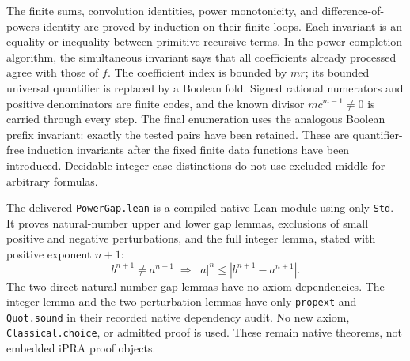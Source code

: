 The finite sums, convolution identities, power monotonicity, and
difference-of-powers identity are proved by induction on their finite
loops.  Each invariant is an equality or inequality between primitive
recursive terms.  In the power-completion algorithm, the simultaneous
invariant says that all coefficients already processed agree with those
of $f$.  The coefficient index is bounded by $mr$; its bounded universal
quantifier is replaced by a Boolean fold.  Signed rational numerators
and positive denominators are finite codes, and the known divisor
$mc^{m-1}\ne0$ is carried through every step.  The final enumeration
uses the analogous Boolean prefix invariant: exactly the tested pairs
have been retained.  These are quantifier-free induction invariants
after the fixed finite data functions have been introduced.  Decidable
integer case distinctions do not use excluded middle for arbitrary
formulas.

The delivered \texttt{PowerGap.lean} is a compiled native Lean module
using only \texttt{Std}.  It proves natural-number upper and lower gap
lemmas, exclusions of small positive and negative perturbations, and
the full integer lemma, stated with positive exponent $n+1$:
\[
 b^{n+1}\ne a^{n+1}\;\Longrightarrow\;
 |a|^n\leq|b^{n+1}-a^{n+1}|.
\]
The two direct natural-number gap lemmas have no axiom dependencies.
The integer lemma and the two perturbation lemmas have only
\texttt{propext} and \texttt{Quot.sound} in their recorded native
dependency audit.  No new axiom, \texttt{Classical.choice}, or admitted
proof is used.  These remain native theorems, not embedded iPRA proof
objects.

